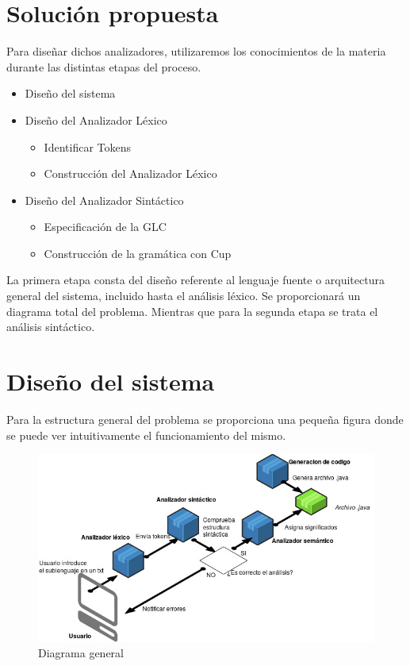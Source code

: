 \documentclass[12pt,a4paper]{article}
\begin{document}
\section{Solución propuesta}
Para diseñar dichos analizadores, utilizaremos los conocimientos de la materia durante las distintas etapas del proceso.

\begin{itemize}
	\item Diseño del sistema
	\item Diseño del Analizador Léxico  \begin{itemize}
		\item Identificar Tokens
		\item Construcción del Analizador Léxico
	\end{itemize}
	
	\item Diseño del Analizador Sintáctico  \begin{itemize}
		\item Especificación de la GLC
		\item Construcción de la gramática con Cup
	\end{itemize}
	
\end{itemize}
La primera etapa consta del diseño referente al lenguaje fuente o arquitectura general del sistema, incluido hasta el análisis léxico. Se proporcionará un diagrama total del problema.
Mientras que para la segunda etapa se trata el análisis sintáctico.
\clearpage
\section{Diseño del sistema}
Para la estructura general del problema se proporciona una pequeña figura \cite{draw} donde se puede ver intuitivamente el funcionamiento del mismo.

\begin{figure}[h]
	\centering
	\includegraphics[width=0.9\linewidth]{img/Diagrama_sistema}
	\caption{Diagrama general}
	\label{fig:diagrama-sistema}
\end{figure}
\end{document}
